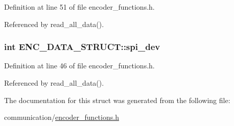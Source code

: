 Definition at line 51 of file encoder\-\_\-functions.\-h.



Referenced by read\-\_\-all\-\_\-data().

\hypertarget{structENC__DATA__STRUCT_a93b8e925392a12a8874bf59f2a1cd76a}{
\subsubsection[{spi\-\_\-dev}]{\setlength{\rightskip}{0pt plus 5cm}int E\-N\-C\-\_\-\-D\-A\-T\-A\-\_\-\-S\-T\-R\-U\-C\-T\-::spi\-\_\-dev}}\label{structENC__DATA__STRUCT_a93b8e925392a12a8874bf59f2a1cd76a}


Definition at line 46 of file encoder\-\_\-functions.\-h.



Referenced by read\-\_\-all\-\_\-data().



The documentation for this struct was generated from the following file\-:\begin{DoxyCompactItemize}
\item 
communication/\hyperlink{encoder__functions_8h}{encoder\-\_\-functions.\-h}\end{DoxyCompactItemize}
